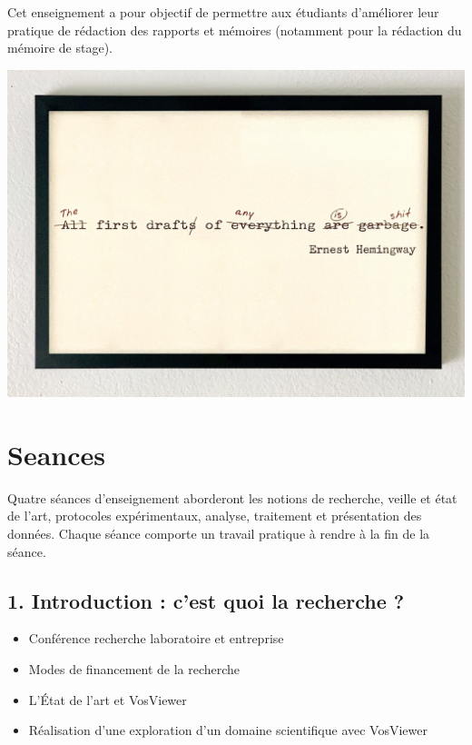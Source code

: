 \documentclass[
]{book}
\providecommand{\tightlist}{%
  \setlength{\itemsep}{0pt}\setlength{\parskip}{0pt}}
\begin{document}
Cet enseignement a pour objectif de permettre aux étudiants d'améliorer leur pratique de rédaction des rapports et mémoires (notamment pour la rédaction du mémoire de stage).

\includegraphics{figures/first-draft.jpg}

\hypertarget{seances}{%
\chapter{Seances}\label{seances}}

Quatre séances d'enseignement aborderont les notions de recherche, veille et état de l'art, protocoles expérimentaux, analyse, traitement et présentation des données.
Chaque séance comporte un travail pratique à rendre à la fin de la séance.

\hypertarget{introduction-cest-quoi-la-recherche}{%
\section{1. Introduction : c'est quoi la recherche ?}\label{introduction-cest-quoi-la-recherche}}

\begin{itemize}
\tightlist
\item
  Conférence recherche laboratoire et entreprise
\item
  Modes de financement de la recherche
\item
  L'État de l'art et VosViewer
\item
  Réalisation d'une exploration d'un domaine scientifique avec VosViewer
\end{itemize}
\end{document}
